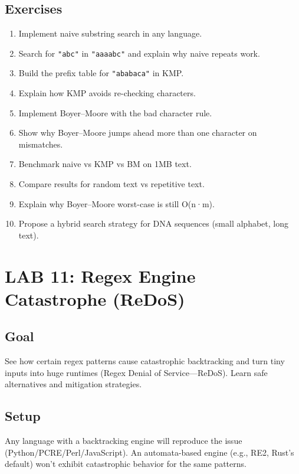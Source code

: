 \documentclass[
  letterpaper,
  DIV=11,
  numbers=noendperiod]{scrreprt}
\providecommand{\tightlist}{%
  \setlength{\itemsep}{0pt}\setlength{\parskip}{0pt}}
\begin{document}
\subsection{Exercises}\label{exercises-53}

\begin{enumerate}
\def\labelenumi{\arabic{enumi}.}
\tightlist
\item
  Implement naive substring search in any language.
\item
  Search for \texttt{"abc"} in \texttt{"aaaabc"} and explain why naive
  repeats work.
\item
  Build the prefix table for \texttt{"ababaca"} in KMP.
\item
  Explain how KMP avoids re-checking characters.
\item
  Implement Boyer--Moore with the bad character rule.
\item
  Show why Boyer--Moore jumps ahead more than one character on
  mismatches.
\item
  Benchmark naive vs KMP vs BM on 1MB text.
\item
  Compare results for random text vs repetitive text.
\item
  Explain why Boyer--Moore worst-case is still O(n·m).
\item
  Propose a hybrid search strategy for DNA sequences (small alphabet,
  long text).
\end{enumerate}

\section{LAB 11: Regex Engine Catastrophe
(ReDoS)}\label{lab-11-regex-engine-catastrophe-redos}

\subsection{Goal}\label{goal-10}

See how certain regex patterns cause catastrophic backtracking and turn
tiny inputs into huge runtimes (Regex Denial of Service---ReDoS). Learn
safe alternatives and mitigation strategies.

\subsection{Setup}\label{setup-10}

Any language with a backtracking engine will reproduce the issue
(Python/PCRE/Perl/JavaScript). An automata-based engine (e.g., RE2,
Rust's default) won't exhibit catastrophic behavior for the same
patterns.
\end{document}
